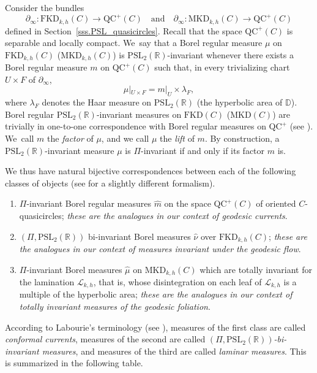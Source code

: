 \documentclass[JEP,XML,SOM,Unicode,NoEqCountersInSection,published]{cedram}
\theoremstyle{plain}
\theoremstyle{definition}
\newcommand\PSL{\mathrm{PSL}_2(\mathbb{R})}
\newcommand{\D}{{\mathbb D}}
\newcommand{\cL}{{\mathcal L}}
\newcommand{\QC}{\mathrm{QC}}
\newcommand{\MKD}{\mathrm{MKD}}
\newcommand{\FKD}{\mathrm{FKD}}
\newcommand{\bord}{\partial_{\infty}}
\begin{document}
Consider the bundles
\[
\bord:\FKD_{k,h}(C)\to\QC^+(C)\quad\text{and}\quad \bord:\MKD_{k,h}(C)\to\QC^+(C)
\]
defined in Section~\ref{sss.PSL_quasicircles}. Recall that the space $\QC^+(C)$ is separable and locally compact. We~say that a Borel regular measure $\mu$ on $\FKD_{k,h}(C)$ (\resp $\MKD_{k,h}(C)$) is $\PSL$-invariant whenever there exists a Borel regular measure $m$ on $\QC^+(C)$ such that, in every trivializing chart $U\times F$ of $\bord$,
\begin{equation*}
\mu|_{U\times F}=m|_U\times\lambda_F,
\end{equation*}
where $\lambda_F$ denotes the Haar measure on $\PSL$ (\resp the hyperbolic area of $\D$). Borel regular $\PSL$-invariant measures on $\FKD(C)$ (\resp $\MKD(C)$) are trivially in one-to-one correspondence with Borel regular measures on $\QC^+$ (see \cite[Lem.\,4.2.1]{ALS}). We~call $m$ the \emph{factor} of $\mu$, and we call $\mu$ the \emph{lift} of $m$. By construction, a $\PSL$-invariant measure $\mu$ is $\Pi$-invariant if and only if its factor $m$ is.

We thus have natural bijective correspondences between each of the following classes of objects (see \cite[\S 4.2]{ALS} for a slightly different formalism).
\begin{enumerate}
\item $\Pi$-invariant Borel regular measures $\hat m$ on the space $\QC^+(C)$ of oriented $C$\nobreakdash-quasicircles; \emph{these are the analogues in our context of geodesic currents}.
\item $(\Pi,\PSL)$ bi-invariant Borel measures $\hat\nu$ over $\FKD_{k,h}(C)$; \emph{these are the analogues in our context of measures invariant under the geodesic flow}.
\item $\Pi$-invariant Borel measures $\hat\mu$ on $\MKD_{k,h}(C)$ which are totally invariant for the lamination $\cL_{k,h}$, that is, whose disintegration on each leaf of $\cL_{k,h}$ is a multiple of the hyperbolic area; \emph{these are the analogues in our context of totally invariant measures of the geodesic foliation}.
\end{enumerate}

According to Labourie's terminology (see \cite{LabourieBourbaki,MN_currents}), measures of the first class are called \emph{conformal currents}, measures of the second are called \emph{$(\Pi,\PSL)$-bi-invariant measures}, and measures of the third are called \emph{laminar measures}. This is summarized in the following table.
\end{document}
